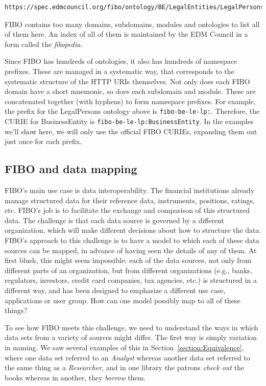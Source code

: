\begin{lstlisting}
https://spec.edmcouncil.org/fibo/ontology/BE/LegalEntities/LegalPersons/BusinessEntity
\end{lstlisting}

FIBO contains too many domains, subdomains, modules and ontologies to list all of them here. An index of all of them
is maintained by the EDM Council in a form called 
the \emph{fibopedia}\cite{fibopedia}.  

Since FIBO has hundreds of ontologies, it also has hundreds of namespace prefixes.  These are managed in a systematic way,
that corresponds to the systematic structure of the HTTP URIs themselves.  Not only does each FIBO domain have a short mnemonic, so 
does each subdomain and module.  These are concatenated together (with hyphens) to form namespace prefixes.  For example, the 
prefix for the LegalPersons ontology above is \texttt{fibo-be-le-lp:}.  Therefore, the CURIE for BusinessEntity 
is \texttt{fibo-be-le-lp:BusinessEntity}.  In the examples we'll show here, we will only use the official FIBO CURIEs, expanding
them out just once for each prefix. 

\subsection{FIBO and data mapping}

FIBO's main use case is data interoperability.  The financial institutions already manage structured data for their reference
data, instruments, positions, ratings, etc.  FIBO's job is to facilitate the exchange and comparison of this structured data. 
The challenge is that each data source is governed by a different organization, 
which will make different decisions about how to 
structure the data.  FIBO's approach to this challenge is to have a model 
to which each of these data sources can be mapped,  in advance of having seen the details 
of any of them.   At first blush, this might seem impossible; each of the 
data sources, not only from different parts of an organization, but 
from different organizations (e.g., banks, regulators, investors, credit card companies, 
tax agencies, etc.) is structured in a different way, 
and 
has been designed to emphasize a different use case, applications or
user group. 
How can one model 
possibly map to all of these things?

To see how FIBO meets this challenge, we need to understand the ways in 
which data sets from a variety of sources might differ.  
The first way is simply variation in naming.    
We saw several examples of this in Section~\ref{section:Equivalence}, where one
data set referred to an \emph{Analyst} whereas another 
data set referred to the same thing as a \emph{Researcher}, and in one 
library 
the patrons \emph{check out} the books whereas in another, 
they \emph{borrow} them.  

